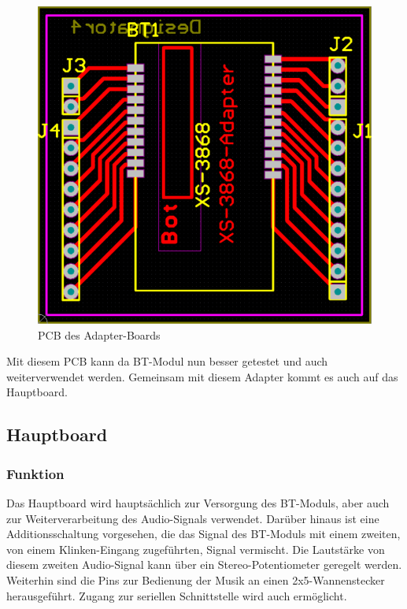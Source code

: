 \begin{figure} [H]
	\centering
	\includegraphics[width=1\textwidth]{img/BTModul/adapter_pcb.png}
	\caption{PCB des Adapter-Boards}\label {fig:4.1.8.2}
\end{figure} 
Mit diesem PCB kann da BT-Modul nun besser getestet und auch weiterverwendet werden. Gemeinsam mit diesem Adapter kommt es auch auf das Hauptboard.
\newpage


\subsection{Hauptboard} \label{subsec:4.1.9}
\subsubsection{Funktion} \label{subsubsec:4.1.9.1}
Das Hauptboard wird hauptsächlich zur Versorgung des BT-Moduls, aber auch zur Weiterverarbeitung des Audio-Signals verwendet. Darüber hinaus ist eine Additionsschaltung vorgesehen, die das Signal des BT-Moduls mit einem zweiten, von einem Klinken-Eingang zugeführten, Signal vermischt. Die Lautstärke von diesem zweiten Audio-Signal kann über ein Stereo-Potentiometer geregelt werden. \\
Weiterhin sind die Pins zur Bedienung der Musik an einen 2x5-Wannenstecker herausgeführt. Zugang zur seriellen Schnittstelle wird auch ermöglicht.

